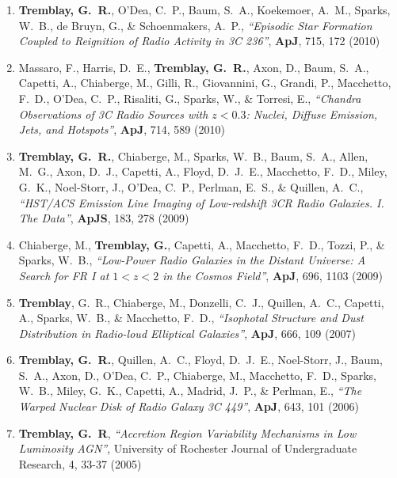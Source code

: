 \documentclass[11pt]{article}
\begin{document}
\begin{enumerate}
\item \textbf{Tremblay, G.~R.}, O'Dea, C.~P., Baum, S.~A., Koekemoer, A.~M., Sparks,
W.~B., de Bruyn, G.,
\& Schoenmakers, A.~P.,  \textit{``Episodic Star Formation Coupled to Reignition of Radio Activity in 3C 236''}, \textbf{ApJ}, 715,  172 (2010)




\item Massaro, F.,  Harris, D.~E., \textbf{Tremblay, G.~R.}, Axon, D.,
Baum, S.~A., Capetti, A., Chiaberge, M., Gilli, R.,
Giovannini, G., Grandi, P., Macchetto, F.~D., O'Dea, C.~P., Risaliti, G.,
Sparks, W.,
\& Torresi, E., \textit{``Chandra Observations of 3C Radio Sources with $z < 0.3$: Nuclei, Diffuse Emission, Jets, and Hotspots''}, \textbf{ApJ}, 714,  589 (2010)




\item \textbf{Tremblay, G.~R.}, Chiaberge, M., Sparks, W.~B., Baum, S.~A., Allen,
M.~G., Axon, D.~J., Capetti, A., Floyd, D.~J.~E., Macchetto, F.~D., Miley,
G.~K., Noel-Storr, J., O'Dea, C.~P., Perlman, E.~S.,
\& Quillen, A.~C.,  \textit{``HST/ACS Emission Line Imaging of Low-redshift 3CR Radio Galaxies. I. The Data''}, \textbf{ApJS}, 183,  278 (2009)



\item Chiaberge, M., \textbf{Tremblay, G.}, Capetti, A., Macchetto, F.~D., Tozzi, P.,
\& Sparks, W.~B.,  \textit{``Low-Power Radio Galaxies in the Distant Universe: A Search for FR I at $1< z < 2$ in the Cosmos Field''}, \textbf{ApJ}, 696,  1103 (2009)



\item \textbf{Tremblay}, G.~R., Chiaberge, M., Donzelli, C.~J., Quillen, A.~C.,
Capetti, A., Sparks, W.~B.,
\& Macchetto, F.~D., \textit{``Isophotal Structure and Dust Distribution in Radio-loud Elliptical Galaxies''}, \textbf{ApJ}, 666,  109 (2007)

\item \textbf{Tremblay, G.~R.}, Quillen, A.~C., Floyd, D.~J.~E., Noel-Storr, J., Baum,
S.~A., Axon, D., O'Dea, C.~P., Chiaberge, M., Macchetto, F.~D., Sparks,
W.~B., Miley, G.~K., Capetti, A., Madrid, J.~P.,
\& Perlman, E.,   \textit{``The Warped Nuclear Disk of Radio Galaxy 3C 449''}, \textbf{ApJ}, 643,  101 (2006)


\item \textbf{Tremblay, G.~R}, \textit{``Accretion Region Variability Mechanisms in Low Luminosity AGN''}, University of Rochester Journal of Undergraduate Research, 4, 33-37 (2005)

\end{enumerate}
\end{document}
